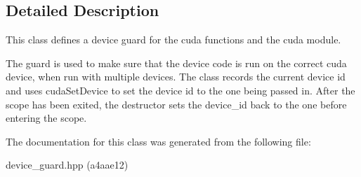 \subsection{Detailed Description}
This class defines a device guard for the cuda functions and the cuda module. 

The guard is used to make sure that the device code is run on the correct cuda device, when run with multiple devices. The class records the current device id and uses {\ttfamily cuda\+Set\+Device} to set the device id to the one being passed in. After the scope has been exited, the destructor sets the device\+\_\+id back to the one before entering the scope. 

The documentation for this class was generated from the following file\+:\begin{DoxyCompactItemize}
\item 
device\+\_\+guard.\+hpp (a4aae12)\end{DoxyCompactItemize}
